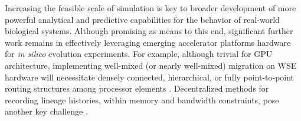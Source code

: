 Increasing the feasible scale of simulation is key to broader development of more powerful analytical and predictive capabilities for the behavior of real-world biological systems.
Although promising as means to this end, significant further work remains in effectively leveraging emerging accelerator platforms hardware for \textit{in silico} evolution experiments.
For example, although trivial for GPU architecture, implementing well-mixed (or nearly well-mixed) migration on WSE hardware will necessitate densely connected, hierarchical, or fully point-to-point routing structures among processor elements \citep{james2020physical,luczynski2024near}.
Decentralized methods for recording lineage histories, within memory and bandwidth constraints, pose another key challenge \citep{moreno2024trackable}.
